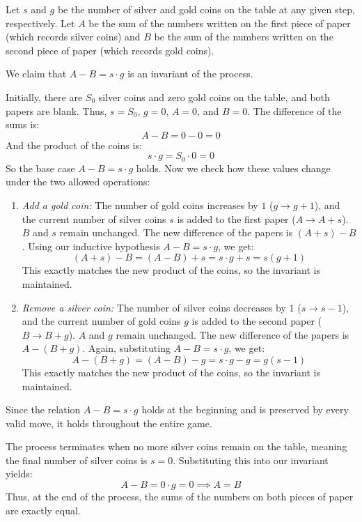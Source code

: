 \begin{solution}
    Let \( s \) and \( g \) be the number of silver and gold coins on the table at any given step, respectively. Let \( A \) be the sum of the numbers written on the first piece of paper (which records silver coins) and \( B \) be the sum of the numbers written on the second piece of paper (which records gold coins).

    We claim that \( A - B = s \cdot g \) is an invariant of the process.

    Initially, there are \( S_0 \) silver coins and zero gold coins on the table, and both papers are blank. Thus, \( s = S_0 \), \( g = 0 \), \( A = 0 \), and \( B = 0 \). The difference of the sums is:
    \[
        A - B = 0 - 0 = 0
    \]
    And the product of the coins is:
    \[
        s \cdot g = S_0 \cdot 0 = 0
    \]
    So the base case \( A - B = s \cdot g \) holds. Now we check how these values change under the two allowed operations:

    \begin{enumerate}
        \item \textit{Add a gold coin:} The number of gold coins increases by \( 1 \) (\( g \to g+1 \)), and the current number of silver coins \( s \) is added to the first paper (\( A \to A+s \)). \( B \) and \( s \) remain unchanged. The new difference of the papers is \( \left(A + s\right) - B \). Using our inductive hypothesis \( A - B = s \cdot g \), we get:
            \[
                \left(A + s\right) - B = \left(A - B\right) + s = s \cdot g + s = s\left(g + 1\right)
            \]
            This exactly matches the new product of the coins, so the invariant is maintained.

        \item \textit{Remove a silver coin:} The number of silver coins decreases by \( 1 \) (\( s \to s-1 \)), and the current number of gold coins \( g \) is added to the second paper (\( B \to B+g \)). \( A \) and \( g \) remain unchanged. The new difference of the papers is \( A - \left(B + g\right) \). Again, substituting \( A - B = s \cdot g \), we get:
            \[
                A - \left(B + g\right) = \left(A - B\right) - g = s \cdot g - g = g\left(s - 1\right)
            \]
            This exactly matches the new product of the coins, so the invariant is maintained.
    \end{enumerate}

    Since the relation \( A - B = s \cdot g \) holds at the beginning and is preserved by every valid move, it holds throughout the entire game.

    The process terminates when no more silver coins remain on the table, meaning the final number of silver coins is \( s = 0 \). Substituting this into our invariant yields:
    \[
        A - B = 0 \cdot g = 0 \implies A = B
    \]
    Thus, at the end of the process, the sums of the numbers on both pieces of paper are exactly equal.
\end{solution}
